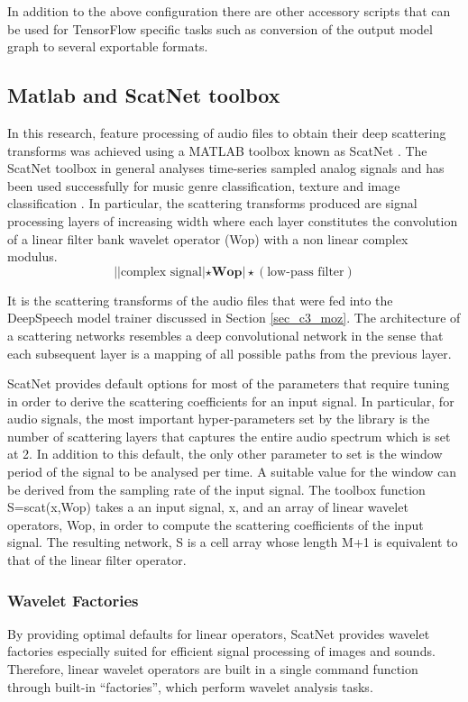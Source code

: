 In addition to the above configuration there are other accessory scripts that can be used for TensorFlow specific tasks such as conversion of the output model graph to several exportable formats.

\subsection{Matlab and ScatNet toolbox}
In this research, feature processing of audio files to obtain their deep scattering transforms was achieved using a MATLAB toolbox known as ScatNet \citep{anden2014scatnet}.  The ScatNet toolbox in general analyses time-series sampled analog signals and has been used successfully for music genre classification, texture and image classification \citep{anden2011multiscale,sifre2013rotation,sifre2014rigid}.  In particular, the scattering transforms produced are signal processing layers of increasing width where each layer constitutes the convolution of a linear filter bank wavelet operator (Wop) with a non linear complex modulus.  
\begin{equation}
    ||\text{complex signal}|\star \mathbf{Wop}|\star(\text{low-pass filter}) \label{eqn_c3_scat00}
\end{equation}

It is the scattering transforms of the audio files that were fed into the DeepSpeech model trainer discussed in Section \ref{sec_c3_moz}.  The architecture of a scattering networks resembles a deep convolutional network in the sense that each subsequent layer is a mapping of all possible paths from the previous layer.

ScatNet provides default options for most of the parameters that require tuning in order to derive the scattering coefficients for an input signal.  In particular, for audio signals, the most important hyper-parameters set by the library is the number of scattering layers that captures the entire audio spectrum which is set at 2.  In addition to this default, the only other parameter to set is the window period of the signal to be analysed per time.  A suitable value for the window can be derived from the sampling rate of the input signal.  The toolbox function S=scat(x,Wop) takes a an input signal, x,  and an array of linear wavelet operators, Wop, in order to compute the scattering coefficients of the input signal.   The resulting network, S is a cell array whose length M+1 is equivalent to that of the linear filter operator.  

\subsubsection{Wavelet Factories} 
By providing optimal defaults for linear operators, ScatNet provides wavelet factories especially suited for efficient signal processing of images and sounds.  Therefore, linear wavelet operators are built in a single command function through built-in “factories”, which perform wavelet analysis tasks.


